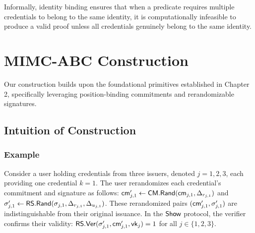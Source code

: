 Informally, identity binding ensures that when a predicate requires multiple credentials to belong to the same identity, it is computationally infeasible to produce a valid proof unless all credentials genuinely belong to the same identity.

\section{MIMC-ABC Construction}
Our construction builds upon the foundational primitives established in Chapter 2, specifically leveraging position-binding commitments and rerandomizable signatures.

\subsection{Intuition of Construction}

\subsubsection{Example}
Consider a user holding credentials from three issuers, denoted $j = 1, 2, 3$, each providing one credential $k = 1$. The user rerandomizes each credential’s commitment and signature as follows: $\mathsf{cm}_{j,1}' \gets \mathsf{CM.Rand}(\mathsf{cm}_{j,1}, \Delta_{r_{j,1}})$ and $\sigma_{j,1}' \gets \mathsf{RS.Rand}(\sigma_{j,1}, \Delta_{r_{j,1}}, \Delta_{u_{j,1}})$. These rerandomized pairs $(\mathsf{cm}_{j,1}', \sigma_{j,1}')$ are indistinguishable from their original issuance. In the $\mathsf{Show}$ protocol, the verifier confirms their validity: $\mathsf{RS.Ver}(\sigma_{j,1}', \mathsf{cm}_{j,1}', \mathsf{vk}_j) = 1$ for all $j \in \{1, 2, 3\}$.


